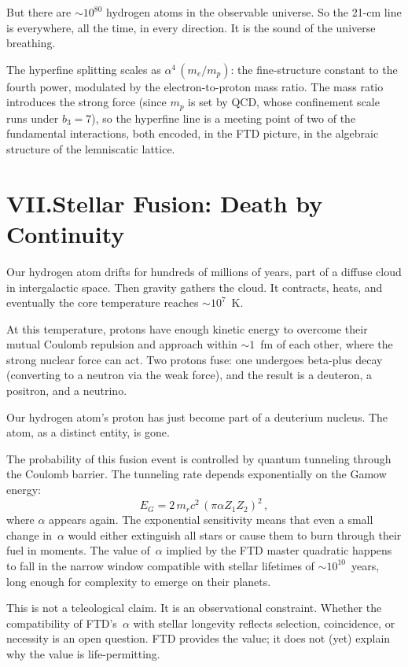 \documentclass[11pt,a4paper]{article}
\begin{document}
But there are $\sim 10^{80}$ hydrogen atoms in the observable universe.  So
the 21-cm line is everywhere, all the time, in every direction.  It is the
sound of the universe breathing.

The hyperfine splitting scales as $\alpha^4\,(m_e/m_p)$: the fine-structure
constant to the fourth power, modulated by the electron-to-proton mass
ratio.  The mass ratio introduces the strong force (since $m_p$ is set by
QCD, whose confinement scale runs under $b_3=7$), so the hyperfine line is a
meeting point of two of the fundamental interactions, both encoded, in the
FTD picture, in the algebraic structure of the lemniscatic lattice.

\section*{VII.\quad Stellar Fusion: Death by Continuity}

Our hydrogen atom drifts for hundreds of millions of years, part of a
diffuse cloud in intergalactic space.  Then gravity gathers the cloud.  It
contracts, heats, and eventually the core temperature reaches $\sim 10^7$~K.

At this temperature, protons have enough kinetic energy to overcome their
mutual Coulomb repulsion and approach within $\sim 1$~fm of each other,
where the strong nuclear force can act.  Two protons fuse: one undergoes
beta-plus decay (converting to a neutron via the weak force), and the result
is a deuteron, a positron, and a neutrino.

Our hydrogen atom's proton has just become part of a deuterium nucleus.  The
atom, as a distinct entity, is gone.

The probability of this fusion event is controlled by quantum tunneling
through the Coulomb barrier.  The tunneling rate depends exponentially on the
Gamow energy:
\[
E_G = 2\,m_r c^2\,(\pi\alpha Z_1 Z_2)^2\,,
\]
where $\alpha$ appears again.  The exponential sensitivity means that even a
small change in~$\alpha$ would either extinguish all stars or cause them to
burn through their fuel in moments.  The value of~$\alpha$ implied by the
FTD master quadratic happens to fall in the narrow window compatible with
stellar lifetimes of $\sim 10^{10}$~years, long enough for complexity to
emerge on their planets.

This is not a teleological claim.  It is an observational constraint.
Whether the compatibility of FTD's~$\alpha$ with stellar longevity
reflects selection, coincidence, or necessity is an open question.  FTD
provides the value; it does not (yet) explain why the value is
life-permitting.
\end{document}

